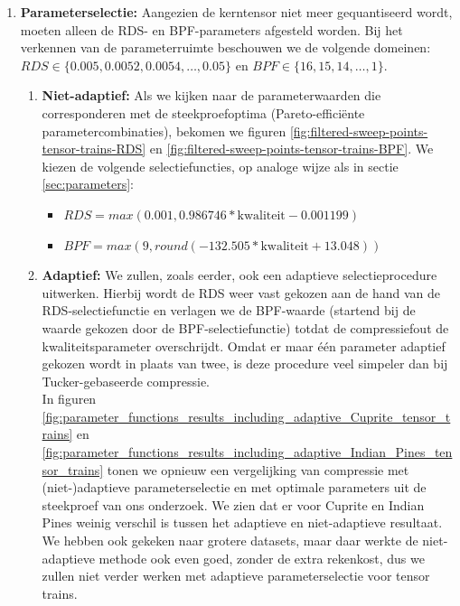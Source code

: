 \begin{enumerate}
\item \textbf{Parameterselectie:} Aangezien de kerntensor niet meer gequantiseerd wordt, moeten alleen de RDS- en BPF-parameters afgesteld worden. Bij het verkennen van de parameterruimte beschouwen we de volgende domeinen: $RDS \in \{0.005, 0.0052, 0.0054, \dots, 0.05\}$ en $BPF \in \{16, 15, 14, \dots, 1\}$.
\begin{enumerate}

\item \textbf{Niet-adaptief:} Als we kijken naar de parameterwaarden die corresponderen met de steekproefoptima (Pareto-effici\"ente parametercombinaties), bekomen we figuren \ref{fig:filtered-sweep-points-tensor-trains-RDS} en \ref{fig:filtered-sweep-points-tensor-trains-BPF}. We kiezen de volgende selectiefuncties, op analoge wijze als in sectie \ref{sec:parameters}:
\begin{itemize}
\item $RDS = max(0.001, 0.986746*\text{kwaliteit} - 0.001199)$
\item $BPF = max(9, round(-132.505*\text{kwaliteit} + 13.048))$
\end{itemize}

\newpage
\item \textbf{Adaptief:} We zullen, zoals eerder, ook een adaptieve selectieprocedure uitwerken. Hierbij wordt de RDS weer vast gekozen aan de hand van de RDS-selectiefunctie en verlagen we de BPF-waarde (startend bij de waarde gekozen door de BPF-selectiefunctie) totdat de compressiefout de kwaliteitsparameter overschrijdt. Omdat er maar \'e\'en parameter adaptief gekozen wordt in plaats van twee, is deze procedure veel simpeler dan bij Tucker-gebaseerde compressie.\\

In figuren \ref{fig:parameter_functions_results_including_adaptive_Cuprite_tensor_trains} en \ref{fig:parameter_functions_results_including_adaptive_Indian_Pines_tensor_trains} tonen we opnieuw een vergelijking van compressie met (niet-)adaptieve parameterselectie en met optimale parameters uit de steekproef van ons onderzoek. We zien dat er voor Cuprite en Indian Pines weinig verschil is tussen het adaptieve en niet-adaptieve resultaat. We hebben ook gekeken naar grotere datasets, maar daar werkte de niet-adaptieve methode ook even goed, zonder de extra rekenkost, dus we zullen niet verder werken met adaptieve parameterselectie voor tensor trains.

\end{enumerate}
\end{enumerate}

